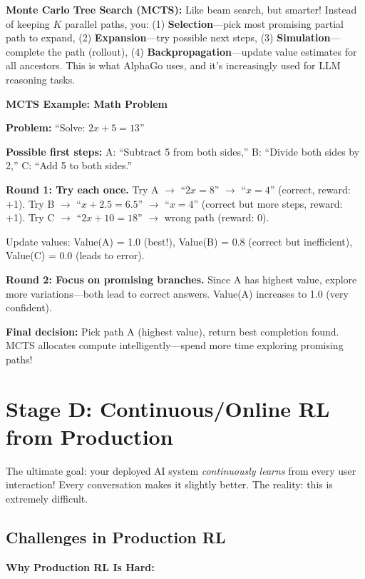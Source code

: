 \begin{chapterenv}
\textbf{Monte Carlo Tree Search (MCTS):} Like beam search, but smarter! Instead of keeping $K$ parallel paths, you: (1) \textbf{Selection}---pick most promising partial path to expand, (2) \textbf{Expansion}---try possible next steps, (3) \textbf{Simulation}---complete the path (rollout), (4) \textbf{Backpropagation}---update value estimates for all ancestors. This is what AlphaGo uses, and it's increasingly used for LLM reasoning tasks.

\textbf{MCTS Example: Math Problem}

\textbf{Problem:} ``Solve: $2x + 5 = 13$''

\textbf{Possible first steps:} A: ``Subtract 5 from both sides,'' B: ``Divide both sides by 2,'' C: ``Add 5 to both sides.''

\textbf{Round 1: Try each once.} Try A $\to$ ``$2x = 8$'' $\to$ ``$x = 4$'' (correct, reward: +1). Try B $\to$ ``$x + 2.5 = 6.5$'' $\to$ ``$x = 4$'' (correct but more steps, reward: +1). Try C $\to$ ``$2x + 10 = 18$'' $\to$ wrong path (reward: 0).

Update values: Value(A) = 1.0 (best!), Value(B) = 0.8 (correct but inefficient), Value(C) = 0.0 (leads to error).

\textbf{Round 2: Focus on promising branches.} Since A has highest value, explore more variations---both lead to correct answers. Value(A) increases to 1.0 (very confident).

\textbf{Final decision:} Pick path A (highest value), return best completion found. MCTS allocates compute intelligently---spend more time exploring promising paths!

\section{Stage D: Continuous/Online RL from Production}

\begin{tipbox}
The ultimate goal: your deployed AI system \textit{continuously learns} from every user interaction! Every conversation makes it slightly better. The reality: this is extremely difficult.
\end{tipbox}

\subsection{Challenges in Production RL}

\begin{infobox}
\textbf{Why Production RL Is Hard:}


\end{infobox}
\end{chapterenv}
